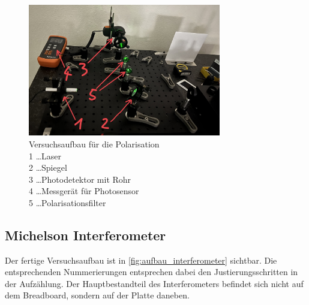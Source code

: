\documentclass[12pt,english,ngerman]{scrartcl}
\begin{document}
\begin{figure}[H]
	\begin{center}
		\includegraphics[width =0.75\textwidth]{./figures/aufbau_polarisation.jpg}
	\end{center}
	\caption[Versuchsaufbau für die Polarisation] { Versuchsaufbau für die Polarisation \\
		1 \dots Laser                       \\
		2 \dots Spiegel                     \\
		3 \dots Photodetektor mit Rohr      \\
		4 \dots Messgerät für Photosensor   \\
		5 \dots Polarisationsfilter
	}\label{fig:aufbau_polarisation}
\end{figure}

\subsection{Michelson Interferometer}

Der fertige Versuchsaufbau ist in \autoref{fig:aufbau_interferometer} sichtbar.
Die entsprechenden Nummerierungen entsprechen dabei den Justierungsschritten in
der Aufzählung. Der Hauptbestandteil des Interferometers befindet sich nicht
auf dem Breadboard, sondern auf der Platte daneben.
\end{document}
